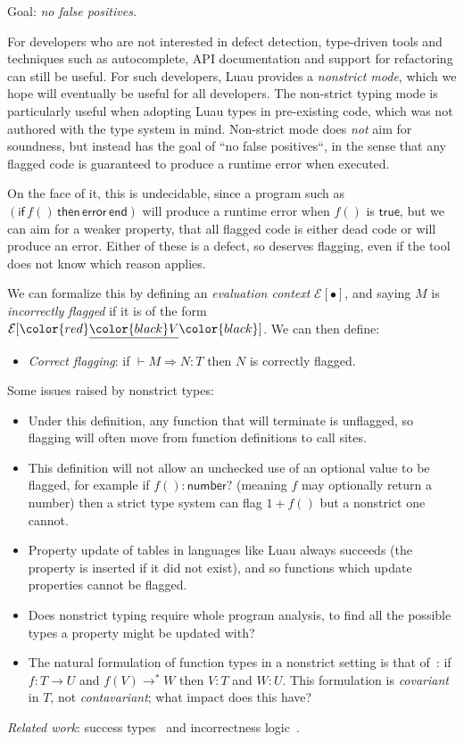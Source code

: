 \documentclass[acmsmall]{acmart}
\newcommand{\squnder}[1]{\color{red}\underline{{\color{black}#1}}\color{black}}
\newcommand{\evCtx}{\mathcal{E}}
\newcommand{\TRUE}{\mathsf{true}}
\newcommand{\NUMBER}{\mathsf{number}}
\newcommand{\ERROR}{\mathsf{error}}
\newcommand{\IF}{\mathsf{if}\,}
\newcommand{\THEN}{\,\mathsf{then}\,}
\newcommand{\END}{\,\mathsf{end}}
\begin{document}
Goal: \emph{no false positives.}

For developers who are not interested in defect detection, type-driven
tools and techniques such as autocomplete, API documentation
and support for refactoring can still be useful.
For such developers, Luau provides a
\emph{nonstrict mode}, which we hope will eventually be useful for all
developers.  The non-strict typing mode is particularly useful when
adopting Luau types in pre-existing code, which was not authored with
the type system in mind.  Non-strict mode does \emph{not} aim for
soundness, but instead has the goal of ``no false positives``, in the
sense that any flagged code is guaranteed to produce a runtime error
when executed.

On the face of it, this is undecidable, since a program such as
$(\IF f() \THEN \ERROR \END)$ will produce a runtime error when $f()$ is
$\TRUE$, but we can aim for a weaker property, that all flagged code
is either dead code or will produce an error. Either of these is a
defect, so deserves flagging, even if the tool does not know
which reason applies.

We can formalize this by defining an \emph{evaluation context}
$\evCtx[\bullet]$, and saying $M$ is \emph{incorrectly flagged}
if it is of the form $\evCtx[\squnder{V}]$. We can then define:
\begin{itemize}
\item \emph{Correct flagging}: if ${} \vdash M \Rightarrow N : T$
  then $N$ is correctly flagged.
\end{itemize}
Some issues raised by nonstrict types:
\begin{itemize}

\item Under this definition, any function that will terminate is unflagged, so
  flagging will often move from function definitions to call sites.

\item This definition will not allow an unchecked use of an optional value
  to be flagged, for example if $f() : \NUMBER?$ (meaning $f$ may optionally return a number)
  then a strict type system can flag $1 + f()$ but a nonstrict one cannot.

\item Property update of tables in languages like Luau always succeeds
  (the property is inserted if it did not exist), and so functions which
  update properties cannot be flagged.

\item Does nonstrict typing require whole program analysis,
  to find all the possible types a property might be updated with?

\item The natural formulation of function types in a nonstrict setting
  is that of~\cite{???}: if $f: T \rightarrow U$ and $f(V) \rightarrow^* W$
  then $V:T$ and $W:U$. This formulation is \emph{covariant} in $T$,
  not \emph{contavariant}; what impact does this have?
  
\end{itemize}
\emph{Related work}: success types~\cite{SuccessTyping} and incorrectness logic~\cite{IncorrectnessLogic}.
\end{document}
